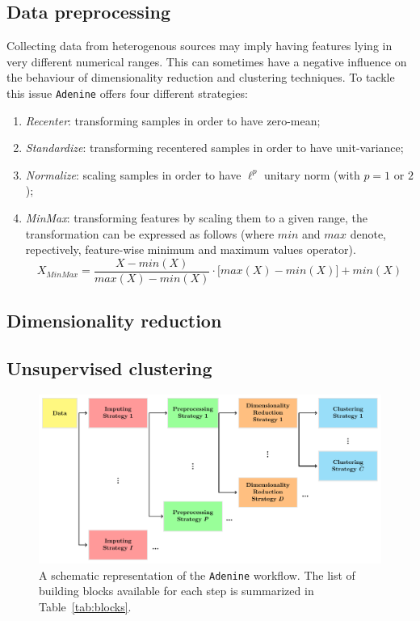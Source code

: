 \documentclass[twoside,11pt]{article}
\makeatletter
\newcommand{\ade}{\texttt{Adenine}\@\xspace}
\makeatother
\begin{document}
\subsection*{Data preprocessing}
Collecting data from heterogenous sources may imply having features lying in very different numerical ranges. This can sometimes have a negative influence on the behaviour of dimensionality reduction and clustering techniques. To tackle this issue \ade offers four different strategies:
\begin{enumerate}[label=(\roman*)]
  \item \emph{Recenter}: transforming samples in order to have zero-mean;
  \item \emph{Standardize}: transforming recentered samples in order to have unit-variance;
  \item \emph{Normalize}: scaling samples in order to have $\ell^p$ unitary norm (with $p = 1$ or $2$);
  \item \emph{MinMax}: transforming features by scaling them to a given range, the transformation can be expressed as follows (where $min$ and $max$ denote, repectively, feature-wise minimum and maximum values operator).
  \[
    X_{MinMax} = \frac{X - min(X)}{max(X) - min(X)} \cdot \Big[max(X) - min(X)\Big] + min(X)
  \]
\end{enumerate}

\subsection*{Dimensionality reduction}
\subsection*{Unsupervised clustering}


\begin{figure}[h!]
    \centering
    \includegraphics[width=\textwidth]{ade_wf/ade_wf.pdf}
    \caption{A schematic representation of the \ade workflow. The list of building blocks available for each step is summarized in Table~\ref{tab:blocks}.}\label{fig:workflow}
\end{figure}
\end{document}
